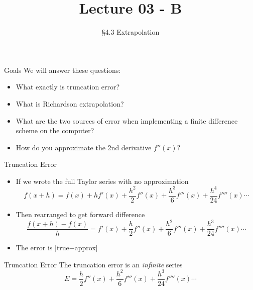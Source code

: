 \documentclass[10pt]{beamer}
\title[Math/CS 375]{Lecture 03 - B}
\subtitle{\S 4.3 Extrapolation}
\begin{document}
\begin{frame}
  \titlepage
\end{frame}

\begin{frame}{Goals}
We will answer these questions:\\[3mm]
\begin{itemize}
    \item What exactly is truncation error?
    \item What is Richardson extrapolation?
    \item What are the two sources of error when implementing a finite difference scheme on the computer?
    \item How do you approximate the 2nd derivative $f''(x)?$
\end{itemize}
\end{frame}


\begin{frame}{Truncation Error}
    \begin{itemize}
        \item If we wrote the full Taylor series with no approximation
            \begin{equation*}
            f(x+h) = f(x) + h f'(x) + \frac{h^2}{2}f''(x) + \frac{h^3}{6}f'''(x)+\frac{h^4}{24}f''''(x)\cdots
            \end{equation*}
        \item Then rearranged to get forward difference 
            \begin{equation*}
            \frac{f(x+h) -f(x)}{h}=  f'(x) + \frac{h}{2}f''(x) + \frac{h^2}{6}f'''(x)+\frac{h^3}{24}f''''(x)\cdots
            \end{equation*}
        \item The error is $|$true$-$approx$|$
    \end{itemize}
    \begin{block}{Truncation Error}
    The truncation error is an \textit{infinite} series
        $$E=\frac{h}{2}f''(x) + \frac{h^2}{6}f'''(x)+\frac{h^3}{24}f''''(x)\cdots$$
    \end{block}
\end{frame}

\end{document}
